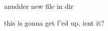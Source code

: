 \documentclass{article}
\begin{document}
anudder new file in dir

this is gonna get f'ed up, isnt it?
\end{document}
